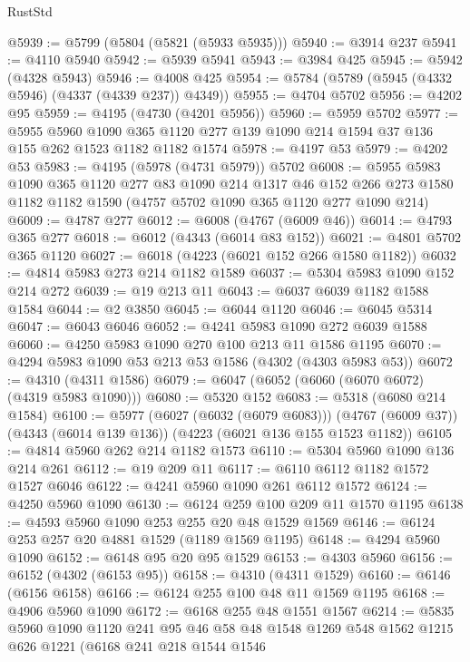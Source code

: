 \begin{lexlean}{RustStd}
\begin{coremodule}
@5939 := @5799 (@5804 (@5821 (@5933 @5935)))
@5940 := @3914 @237
@5941 := @4110 @5940
@5942 := @5939 @5941
@5943 := @3984 @425
@5945 := @5942 (@4328 @5943)
@5946 := @4008 @425
@5954 := @5784 (@5789 (@5945 (@4332 @5946) (@4337 (@4339 @237)) @4349))
@5955 := @4704 @5702
@5956 := @4202 @95
@5959 := @4195 (@4730 (@4201 @5956))
@5960 := @5959 @5702
@5977 := @5955
    @5960
    @1090
    @365
    @1120
    @277
    @139
    @1090
    @214
    @1594
    @37
    @136
    @155
    @262
    @1523
    @1182
    @1182
    @1574
@5978 := @4197 @53
@5979 := @4202 @53
@5983 := @4195 (@5978 (@4731 @5979)) @5702
@6008 := @5955
    @5983
    @1090
    @365
    @1120
    @277
    @83
    @1090
    @214
    @1317
    @46
    @152
    @266
    @273
    @1580
    @1182
    @1182
    @1590
    (@4757 @5702 @1090 @365 @1120 @277 @1090 @214)
@6009 := @4787 @277
@6012 := @6008 (@4767 (@6009 @46))
@6014 := @4793 @365 @277
@6018 := @6012 (@4343 (@6014 @83 @152))
@6021 := @4801 @5702 @365 @1120
@6027 := @6018 (@4223 (@6021 @152 @266 @1580 @1182))
@6032 := @4814 @5983 @273 @214 @1182 @1589
@6037 := @5304 @5983 @1090 @152 @214 @272
@6039 := @19 @213 @11
@6043 := @6037 @6039 @1182 @1588 @1584
@6044 := @2 @3850
@6045 := @6044 @1120
@6046 := @6045 @5314
@6047 := @6043 @6046
@6052 := @4241 @5983 @1090 @272 @6039 @1588
@6060 := @4250 @5983 @1090 @270 @100 @213 @11 @1586 @1195
@6070 := @4294 @5983 @1090 @53 @213 @53 @1586 (@4302 (@4303 @5983 @53))
@6072 := @4310 (@4311 @1586)
@6079 := @6047 (@6052 (@6060 (@6070 @6072) (@4319 @5983 @1090)))
@6080 := @5320 @152
@6083 := @5318 (@6080 @214 @1584)
@6100 := @5977
    (@6027 (@6032 (@6079 @6083)))
    (@4767 (@6009 @37))
    (@4343 (@6014 @139 @136))
    (@4223 (@6021 @136 @155 @1523 @1182))
@6105 := @4814 @5960 @262 @214 @1182 @1573
@6110 := @5304 @5960 @1090 @136 @214 @261
@6112 := @19 @209 @11
@6117 := @6110 @6112 @1182 @1572 @1527 @6046
@6122 := @4241 @5960 @1090 @261 @6112 @1572
@6124 := @4250 @5960 @1090
@6130 := @6124 @259 @100 @209 @11 @1570 @1195
@6138 := @4593 @5960 @1090 @253 @255 @20 @48 @1529 @1569
@6146 := @6124 @253 @257 @20 @4881 @1529 (@1189 @1569 @1195)
@6148 := @4294 @5960 @1090
@6152 := @6148 @95 @20 @95 @1529
@6153 := @4303 @5960
@6156 := @6152 (@4302 (@6153 @95))
@6158 := @4310 (@4311 @1529)
@6160 := @6146 (@6156 @6158)
@6166 := @6124 @255 @100 @48 @11 @1569 @1195
@6168 := @4906 @5960 @1090
@6172 := @6168 @255 @48 @1551 @1567
@6214 := @5835
    @5960
    @1090
    @1120
    @241
    @95
    @46
    @58
    @48
    @1548
    @1269
    @548
    @1562
    @1215
    @626
    @1221
    (@6168
      @241
      @218
      @1544
      @1546

\end{coremodule}
\end{lexlean}
